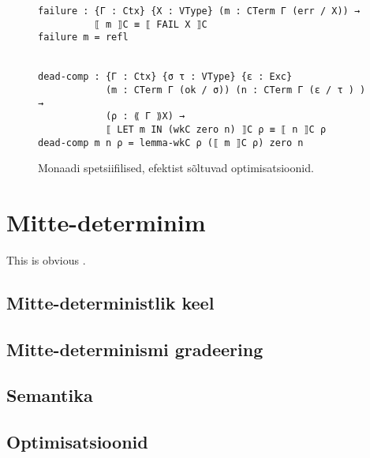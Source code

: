 \documentclass[a4paper,12pt]{article}
\begin{document}
\begin{figure}
  \begin{BVerbatim}
failure : {Γ : Ctx} {X : VType} (m : CTerm Γ (err / X)) →
          ⟦ m ⟧C ≡ ⟦ FAIL X ⟧C
failure m = refl


dead-comp : {Γ : Ctx} {σ τ : VType} {ε : Exc}
            (m : CTerm Γ (ok / σ)) (n : CTerm Γ (ε / τ ) ) →
            (ρ : ⟪ Γ ⟫X) → 
            ⟦ LET m IN (wkC zero n) ⟧C ρ ≡ ⟦ n ⟧C ρ
dead-comp m n ρ = lemma-wkC ρ (⟦ m ⟧C ρ) zero n
  \end{BVerbatim}
  \caption{Monaadi spetsiifilised, efektist sõltuvad optimisatsioonid.}
  \label{fig:exc.opt2}
\end{figure}

\clearpage\vspace*{0pt}


\section{Mitte-determinim}

This is obvious \cite{Benton2016}. \cite{Katsumata2014}

\subsection{Mitte-deterministlik keel}

\subsection{Mitte-determinismi gradeering}

\subsection{Semantika}

\subsection{Optimisatsioonid}



\iffalse
\clearpage\vspace*{0pt}
\section{Võimalikud edasiarendused}

- muteeritava oleku laiendused\\
- mittedeterminismi teine gradeering nd0, 1, 01, 1+, N ja selle optimisatsioonid (pure-lambda-hoist, dead-computation)
\fi
\end{document}
